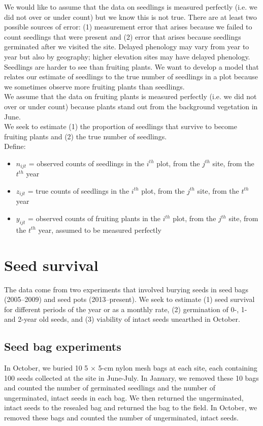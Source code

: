 \documentclass[12pt, oneside]{article}   	%
\begin{document}
We would like to assume that the data on seedlings is measured perfectly (i.e. we did not over or under count) but we know this is not true. There are at least two possible sources of error: (1) measurement error that arises because we failed to count seedlings that were present and (2) error that arises because seedlings germinated after we visited the site. Delayed phenology may vary from year to year but also by geography; higher elevation sites may have delayed phenology. Seedlings are harder to see than fruiting plants. We want to develop a model that relates our estimate of seedlings to the true number of seedlings in a plot because we sometimes observe more fruiting plants than seedlings. \\

We assume that the data on fruiting plants is measured perfectly (i.e. we did not over or under count) because plants stand out from the background vegetation in June. \\

We seek to estimate (1) the proportion of seedlings that survive to become fruiting plants and (2) the true number of seedlings.  \\

Define:

\begin{itemize}
	\item $n_{ijt}$ = observed counts of seedlings in the $i^{th}$ plot, from the $j^{th}$ site, from the $t^{th}$ year
	\item $z_{ijt}$ = true counts of seedlings in the $i^{th}$ plot, from the $j^{th}$ site, from the $t^{th}$ year
	\item $y_{ijt}$ = observed counts of fruiting plants in the $i^{th}$ plot, from the $j^{th}$ site, from the $t^{th}$ year, assumed to be measured perfectly
\end{itemize}

\section*{Seed survival }

The data come from two experiments that involved burying seeds in seed bags (2005--2009) and seed pots (2013--present). We seek to estimate (1) seed survival for different periods of the year or as a monthly rate, (2) germination of 0-, 1- and 2-year old seeds, and (3) viability of intact seeds unearthed in October. 

\subsection*{Seed bag experiments}
In October, we buried 10 5 $\times$ 5-cm nylon mesh bags at each site, each containing 100 seeds collected at the site in June-July. In January, we removed these 10 bags and counted the number of germinated seedlings and the number of ungerminated, intact seeds in each bag. We then returned the ungerminated, intact seeds to the resealed bag and returned the bag to the field. In October, we removed these bags and counted the number of ungerminated, intact seeds. \\
\end{document}
